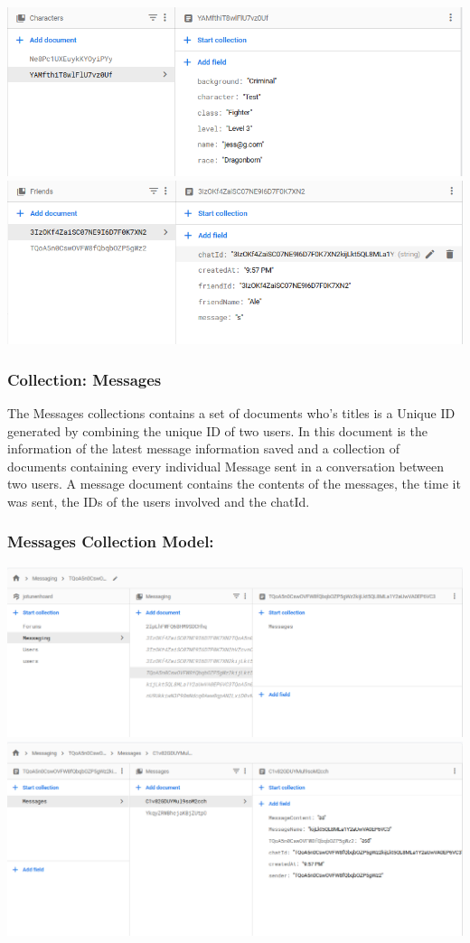 \includegraphics[scale=0.3]{./img/Characters.png}
\includegraphics[scale=0.3]{./img/Friends.png}

\subsubsection{Collection: Messages}
The Messages collections contains a set of documents who's titles is a Unique ID generated by combining the unique ID of two users. In this document is the information of the latest message information saved and a collection of documents containing every individual Message sent in a conversation between two users. A message document contains the contents of the messages, the time it was sent, the IDs of the users involved and the chatId.
\subsubsection{Messages Collection Model:}
\includegraphics[scale=0.2]{./img/MessagingModel.png}
\includegraphics[scale=0.2]{./img/MessagingDocument.png}


